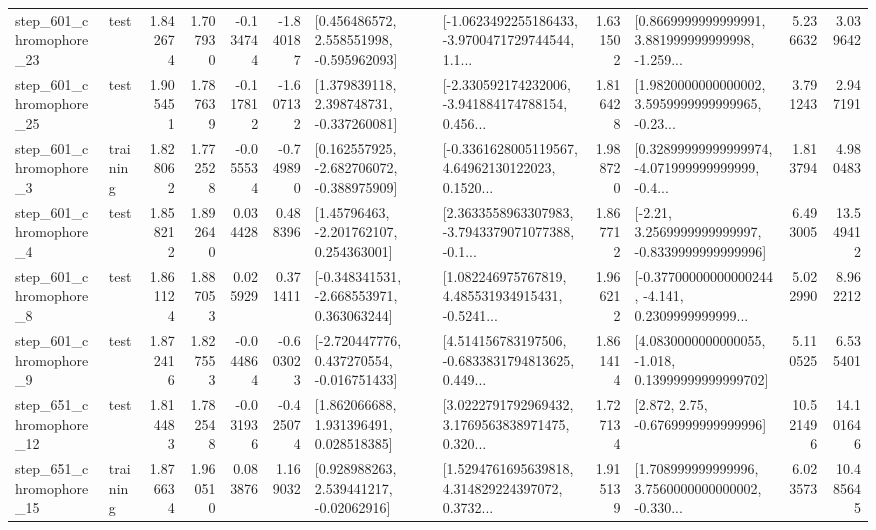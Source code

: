 \begin{tabular}{llrrrrllrlrr}
  step\_601\_chromophore\_23 &      test &      1.842674 &    1.707930 &     -0.134744 & -1.840187 &    [0.456486572, 2.558551998, -0.595962093] &  [-1.0623492255186433, -3.9700471729744544, 1.1... &       1.631502 &  [0.8669999999999991, 3.881999999999998, -1.259... &            5.236632 &          3.039642 \\
  step\_601\_chromophore\_25 &      test &      1.905451 &    1.787639 &     -0.117812 & -1.607132 &    [1.379839118, 2.398748731, -0.337260081] &  [-2.330592174232006, -3.941884174788154, 0.456... &       1.816428 &  [1.9820000000000002, 3.5959999999999965, -0.23... &            3.791243 &          2.947191 \\
   step\_601\_chromophore\_3 &  training &      1.828062 &    1.772528 &     -0.055534 & -0.749890 &   [0.162557925, -2.682706072, -0.388975909] &  [-0.3361628005119567, 4.64962130122023, 0.1520... &       1.988720 &  [0.32899999999999974, -4.071999999999999, -0.4... &            1.813794 &          4.980483 \\
   step\_601\_chromophore\_4 &      test &      1.858212 &    1.892640 &      0.034428 &  0.488396 &     [1.45796463, -2.201762107, 0.254363001] &  [2.3633558963307983, -3.7943379071077388, -0.1... &       1.867712 &   [-2.21, 3.2569999999999997, -0.8339999999999996] &            6.493005 &         13.549412 \\
   step\_601\_chromophore\_8 &      test &      1.861124 &    1.887053 &      0.025929 &  0.371411 &   [-0.348341531, -2.668553971, 0.363063244] &  [1.082246975767819, 4.485531934915431, -0.5241... &       1.966212 &  [-0.37700000000000244, -4.141, 0.2309999999999... &            5.022990 &          8.962212 \\
   step\_601\_chromophore\_9 &      test &      1.872416 &    1.827553 &     -0.044864 & -0.603023 &   [-2.720447776, 0.437270554, -0.016751433] &  [4.514156783197506, -0.6833831794813625, 0.449... &       1.861414 &  [4.0830000000000055, -1.018, 0.13999999999999702] &            5.110525 &          6.535401 \\
  step\_651\_chromophore\_12 &      test &      1.814483 &    1.782548 &     -0.031936 & -0.425074 &     [1.862066688, 1.931396491, 0.028518385] &  [3.0222791792969432, 3.1769563838971475, 0.320... &       1.727134 &                 [2.872, 2.75, -0.6769999999999996] &           10.521496 &         14.101646 \\
  step\_651\_chromophore\_15 &  training &      1.876634 &    1.960510 &      0.083876 &  1.169032 &     [0.928988263, 2.539441217, -0.02062916] &  [1.5294761695639818, 4.314829224397072, 0.3732... &       1.915139 &  [1.708999999999996, 3.7560000000000002, -0.330... &            6.023573 &         10.485645 \\

\end{tabular}
